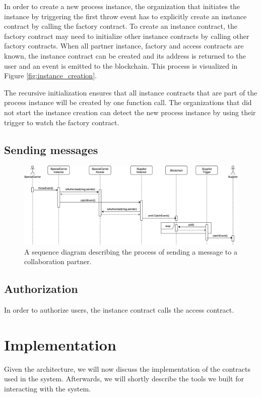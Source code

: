 \documentclass[runningheads]{llncs}
\begin{document}
In order to create a new process instance, the organization that initiates the instance by triggering the first throw event has to explicitly create an instance contract by calling the factory contract.
To create an instance contract, the factory contract may need to initialize other instance contracts by calling other factory contracts.
When all partner instance, factory and access contracts are known, the instance contract can be created and its address is returned to the user and an event is emitted to the blockchain.
This process is visualized in Figure \ref{fig:instance_creation}.

The recursive initialization ensures that all instance contracts that are part of the process instance will be created by one function call.
The organizations that did not start the instance creation can detect the new process instance by using their trigger to watch the factory contract.

\subsection{Sending messages}
\begin{figure}
	\centering
	\includegraphics[width=\textwidth]{fig/event_sending.eps}
	\caption{A sequence diagram describing the process of sending a message to a collaboration partner.} 
	\label{fig:event_sending}
\end{figure}

\subsection{Authorization}
In order to authorize users, the instance contract calls the access contract.

\section{Implementation}

Given the architecture, we will now discuss the implementation of the contracts used in the system.
Afterwards, we will shortly describe the tools we built for interacting with the system.
\end{document}
